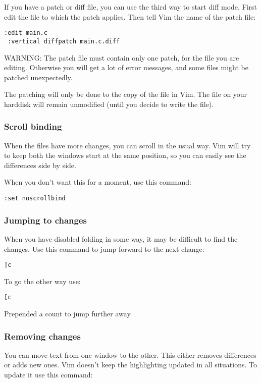 If you have a patch or diff file, you can use the third way to start diff mode.
First edit the file to which the patch applies.
Then tell Vim the name of the patch file:

 \begin{Verbatim}[samepage=true]
 :edit main.c
 :vertical diffpatch main.c.diff
 \end{Verbatim}

WARNING: The patch file must contain only one patch, for the file you are editing.
Otherwise you will get a lot of error messages, and some files might be patched unexpectedly.

The patching will only be done to the copy of the file in Vim.
The file on your harddisk will remain unmodified (until you decide to write the file).

\subsubsection{Scroll binding}
When the files have more changes, you can scroll in the usual way.
Vim will try to keep both the windows start at the same position, so you can easily see the differences side by side.

When you don't want this for a moment, use this command:

 \begin{Verbatim}[samepage=true]
 :set noscrollbind
 \end{Verbatim}

\subsubsection{Jumping to changes}
When you have disabled folding in some way, it may be difficult to find the changes.
Use this command to jump forward to the next change:

 \begin{Verbatim}[samepage=true]
 ]c
 \end{Verbatim}

To go the other way use:

 \begin{Verbatim}[samepage=true]
 [c
 \end{Verbatim}

Prepended a count to jump further away.
\subsubsection{Removing changes}
You can move text from one window to the other.
This either removes differences or adds new ones.
Vim doesn't keep the highlighting updated in all situations.
To update it use this command:

